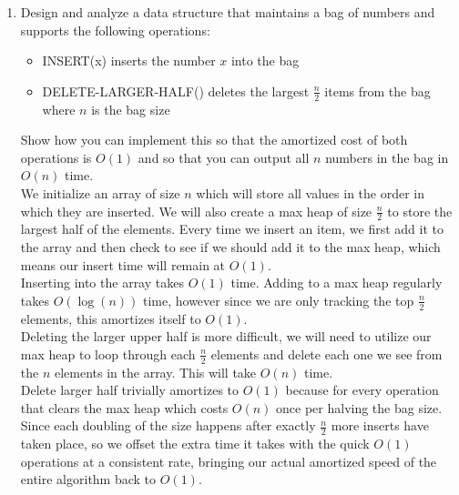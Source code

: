 \documentclass{article}
\begin{document}
\begin{enumerate}
\newpage
\item Design and analyze a data structure that maintains a bag of numbers and supports the following operations: 
\begin{itemize}
\item INSERT(x) inserts the number $x$ into the bag 
\item DELETE-LARGER-HALF() deletes the largest $\frac{n}{2}$ items from the bag where $n$ is the bag size
\end{itemize}
Show how you can implement this so that the amortized cost of both operations is $O(1)$ and so that you can output all $n$ numbers in the bag in $O(n)$ time. \\

We initialize an array of size $n$ which will store all values in the order in which they are inserted. We will also create a max heap of size $\frac{n}{2}$ to store the largest half of the elements. Every time we insert an item, we first add it to the array and then check to see if we should add it to the max heap, which means our insert time will remain at $O(1)$. \\
\newline 
Inserting into the array takes $O(1)$ time. Adding to a max heap regularly takes $O(\log(n))$ time, however since we are only tracking the top $\frac{n}{2}$ elements, this amortizes itself to $O(1)$. \\
\newline 
Deleting the larger upper half is more difficult, we will need to utilize our max heap to loop through each $\frac{n}{2}$ elements and delete each one we see from the $n$ elements in the array. This will take $O(n)$ time. \\
\newline 
Delete larger half trivially amortizes to $O(1)$ because for every operation that clears the max heap which costs $O(n)$ once per halving the bag size. Since each doubling of the size happens after exactly $\frac{n}{2}$ more inserts have taken place, so we offset the extra time it takes with the quick $O(1)$ operations at a consistent rate, bringing our actual amortized speed of the entire algorithm back to $O(1)$. \\
\newline











\end{enumerate}
\end{document}

